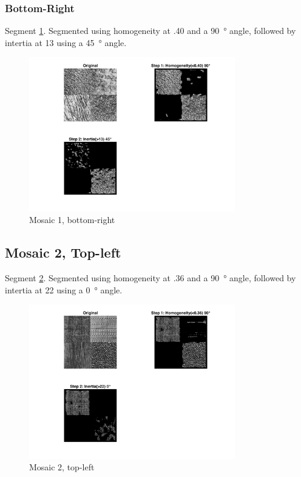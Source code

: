\documentclass[a4paper,12pt,titlepage]{article}
\begin{document}
\subsubsection*{Bottom-Right} 
Segment \ref{fig:Mosaic1SegmentedBottomRight}. Segmented using homogeneity at .40 and a \SI{90}{\degree} angle, followed by intertia at 13 using a \SI{45}{\degree} angle.

\begin{figure}[H]
	\includegraphics[width=0.8\textwidth]{partD-mosaic1-segmentation-bottom-right}
	\caption{Mosaic 1, bottom-right}
	\label{fig:Mosaic1SegmentedBottomRight}
\end{figure}



\subsection*{Mosaic 2, Top-left}
Segment \ref{fig:Mosaic2SegmentedTopLeft}. Segmented using homogeneity at .36 and a \SI{90}{\degree} angle, followed by intertia at 22 using a \SI{0}{\degree} angle.

\begin{figure}[H]
	\includegraphics[width=0.8\textwidth]{partD-mosaic2-segmentation-top-left}
	\caption{Mosaic 2, top-left}
	\label{fig:Mosaic2SegmentedTopLeft}
\end{figure}
\end{document}
